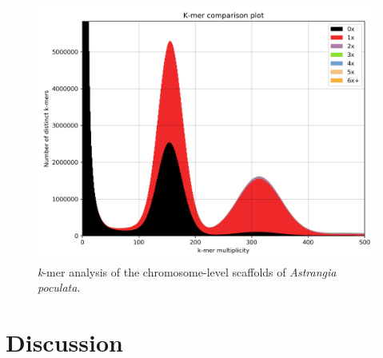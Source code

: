 \begin{figure}[H]
    \centering
    \includegraphics[width=0.9\linewidth]{fig/coral_kat.png}
    \caption{\textit{k}-mer analysis of the chromosome-level scaffolds of \textit{Astrangia poculata}. }
    \label{fig:coral_kat}
\end{figure}

\section{Discussion}

